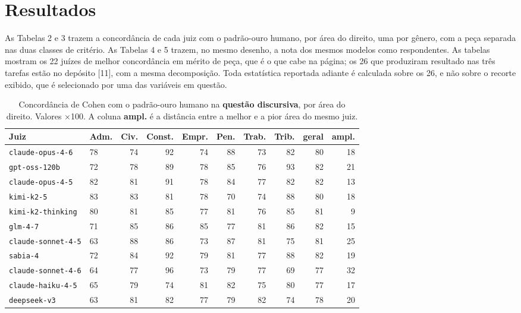 \documentclass{IOS-Book-Article}
\begin{document}
\section{Resultados}

As Tabelas 2 e 3 trazem a concordância de cada juiz com o padrão-ouro humano, por área do direito, uma por gênero, com a peça separada nas duas classes de critério. As Tabelas 4 e 5 trazem, no mesmo desenho, a nota dos mesmos modelos como respondentes. As tabelas mostram os 22 juízes de melhor concordância em mérito de peça, que é o que cabe na página; os 26 que produziram resultado nas três tarefas estão no depósito [11], com a mesma decomposição. Toda estatística reportada adiante é calculada sobre os 26, e não sobre o recorte exibido, que é selecionado por uma das variáveis em questão.

\begin{table}[!ht]
\centering
\caption{Concordância de Cohen com o padrão-ouro humano na \textbf{questão discursiva}, por área do direito. Valores $\times$100. A coluna \textbf{ampl.} é a distância entre a melhor e a pior área do mesmo juiz.}
\footnotesize\setlength{\tabcolsep}{2pt}
\begin{tabular}{llrrrrrrrr}
\hline
\textbf{Juiz} & \textbf{Adm.} & \textbf{Civ.} & \textbf{Const.} & \textbf{Empr.} & \textbf{Pen.} & \textbf{Trab.} & \textbf{Trib.} & \textbf{geral} & \textbf{ampl.} \\
\hline
\texttt{claude-opus-4-6} & 78 & 74 & 92 & 74 & 88 & 73 & 82 & 80 & 18 \\
\texttt{gpt-oss-120b} & 72 & 78 & 89 & 78 & 85 & 76 & 93 & 82 & 21 \\
\texttt{claude-opus-4-5} & 82 & 81 & 91 & 78 & 84 & 77 & 82 & 82 & 13 \\
\texttt{kimi-k2-5} & 83 & 83 & 81 & 78 & 70 & 74 & 88 & 80 & 18 \\
\texttt{kimi-k2-thinking} & 80 & 81 & 85 & 77 & 81 & 76 & 85 & 81 & 9 \\
\texttt{glm-4-7} & 71 & 85 & 86 & 85 & 77 & 81 & 86 & 82 & 15 \\
\texttt{claude-sonnet-4-5} & 63 & 88 & 86 & 73 & 87 & 81 & 75 & 81 & 25 \\
\texttt{sabia-4} & 72 & 84 & 92 & 79 & 81 & 77 & 88 & 82 & 19 \\
\texttt{claude-sonnet-4-6} & 64 & 77 & 96 & 73 & 79 & 77 & 69 & 77 & 32 \\
\texttt{claude-haiku-4-5} & 65 & 79 & 74 & 81 & 82 & 75 & 80 & 77 & 17 \\
\texttt{deepseek-v3} & 63 & 81 & 82 & 77 & 79 & 82 & 74 & 78 & 20 \\

\end{tabular}
\end{table}
\end{document}
